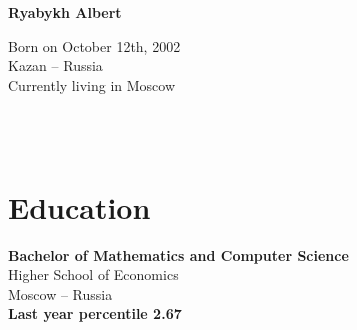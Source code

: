 \documentclass[a4paper,6pt]{article}
\begin{document}
\thispagestyle{empty}

\begin{adjustbox}{valign=t}
\begin{minipage}{0.3\textwidth} %
\begin{center}

\MySkip 	%

{\LARGE \bfseries Ryabykh Albert}

\MySkip 	%

Born on October 12th, 2002\\
Kazan -- Russia\\
Currently living in Moscow\\

\MySkip 	%

\textcolor{ColorTwo}{\faEnvelopeO} 
 \\
 \\

\end{center}

\vfill

\section*{Education}
	\begin{description}
	\raggedright
	\item [\normalfont \textcolor{ColorOne}{Sep 2020 --- Jul 2024}] \textbf{Bachelor of Mathematics and Computer Science} \\
	Higher School of Economics\\
	Moscow -- Russia\\
    \textbf{Last year percentile 2.67}
\end{description}

\vfill
\end{minipage}
\end{adjustbox}
%
%
\end{document}
